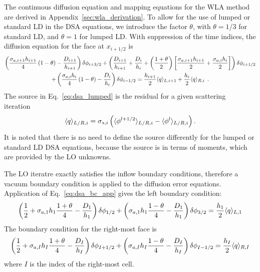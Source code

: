 The continuous diffusion equation and mapping equations for the WLA method are derived in Appendix~\ref{sec:wla_derivation}.
To allow for the use of lumped
or standard LD in the DSA equations, we introduce the factor $\theta$, with
$\theta=1/3$ for standard
LD, and $\theta=1$ for lumped LD.  With suppression of the time indices, the diffusion equation for the face at $x_{i+1/2}$ is 
\begin{multline}\label{eq:dsa_lumped}
    \left(\frac{\sigma_{a,i+1} h_{i+1}}{4}\left(1 - \theta\right)  -
        \frac{D_{i+1}}{h_{i+1}}\right)\delta\phi_{i+3/2} + \left(\frac{D_{i+1}}{h_{i+1}} +
        \frac{D_{i}}{h_i} + \left(\frac{1+\theta}{2} \right)\left[\frac{\sigma_{a,i+1} h_{i+1}}{2} + \frac{\sigma_{a,i}
        h_{i}}{2}\right]\right)\delta\phi_{i+1/2} \\ + \left(\frac{\sigma_{a,i}
        h_{i}}{4}\left(1 - \theta\right) -
        \frac{D_{i}}{h_{i}}\right)\delta\phi_{i-1/2} = \frac{h_{i+1}}{2} \langle q \rangle_{L,i+1} +
        \frac{h_{i}}{2}\langle q \rangle_{R,i}
        \;\,. 
\end{multline}
The source in Eq.~\eqref{eq:dsa_lumped} is the residual for a given scattering iteration~\cite{morel_dsa,lewis}
\begin{equation}\label{eq:dsa_src}
    \langle q \rangle_{L/R,i} = \sigma_{s,i}\left(\langle \phi^{l+1/2} \rangle_{L/R,i} -
    \langle \phi^{l} \rangle_{L/R,i}\right).
\end{equation}
It is noted that there is no need to define the source differently for the lumped or
standard LD DSA equations, because the source is in terms of moments, which are provided
by the LO unknowns.

The LO iteratre exactly satisfies the inflow boundary conditions, therefore
a vacuum boundary condition is applied to the diffusion error equations.
Application of Eq.~\eqref{eq:dsa_bc_app} gives the left boundary condition:
\begin{equation}\label{eq:bc_dsa}
    \left(\frac{1}{2}+ \sigma_{a,1}h_1\frac{1+\theta}{4} - \frac{D_1}{h_1}\right)\delta\phi_{1/2} +
    \left( {\sigma_{a,1}{h_1}}\frac{1-\theta}{4} - \frac{D_1}{h_1}  \right)\delta \phi_{3/2} =
    \frac{h_1}{2} \langle q \rangle_{L,1}
\end{equation}
The boundary condition for the right-most face is
\begin{equation}\label{eq:bc_dsar}
    \left(\frac{1}{2}+ \sigma_{a,I}h_I\frac{1+\theta}{4} - \frac{D_I}{h_I}\right)\delta\phi_{I+1/2} +
    \left( {\sigma_{a,I}{h_I}}\frac{1-\theta}{4} - \frac{D_I}{h_I}  \right)\delta\phi_{I-1/2} =
    \frac{h_I}{2} \langle q \rangle_{R,I}
\end{equation}
where $I$ is the index of the right-most cell. 

